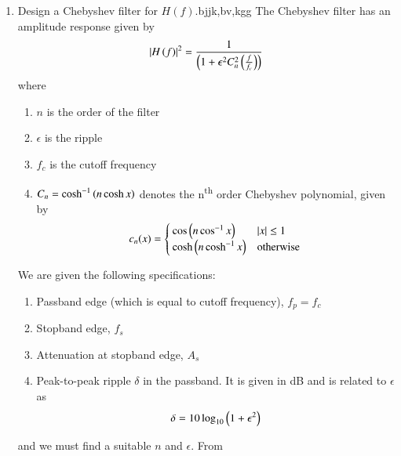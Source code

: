\documentclass[journal,12pt,twocolumn]{IEEEtran}
\renewcommand\thesection{\arabic{section}}
\begin{document}
\begin{enumerate}[label=\thesection.\arabic*
	,ref=\thesection.\theenumi]
	Hence, we take $n = 5$. Solving for $f_c$ in \eqref{eq:fc1} and
	\eqref{eq:fc2},
	\begin{align}
		f_{c1} = f_p\sbrak{10^{-\frac{A_p}{10}} - 1}^{-\frac{1}{2n}} = \SI[parse-numbers=false]{57.23}{\hertz} \\
		f_{c2} = f_s\sbrak{10^{-\frac{A_s}{10}} - 1}^{-\frac{1}{2n}} = \SI[parse-numbers=false]{63.16}{\hertz}
	\end{align}
	Hence, we take $f_c = \sqrt{f_{c1}f_{c2}} = \SI[parse-numbers=false]{60}{\hertz}$ approximately.
	\item Design a Chebyshev filter for $H(f)$.bjjk,bv,kgg
	\solution The Chebyshev filter has an amplitude response
	given by
	\begin{align}
		\left\vert H\left(f\right)\right\vert^2 = \frac{1}{\left(1 + \epsilon^2C_n^2\left(\frac{f}{f_c}\right)\right)}
	\end{align}
	where 
	\begin{enumerate}
		\item $n$ is the order of the filter
		\item $\epsilon$ is the ripple
		\item $f_c$ is the cutoff frequency 
		\item $C_n = \cosh^{-1}\left(n\cosh{x}\right)$ denotes 
		the n\textsuperscript{th} order Chebyshev polynomial,
		given by
		\begin{align}
			c_n(x) =
			\begin{cases}
				\cos\left(n\cos^{-1}x\right) & \left\vert x\right\vert \le 1 \\
				\cosh\left(n\cosh^{-1}x\right) & \textrm{otherwise}
			\end{cases}
			\label{eq:chebypol}
		\end{align}
	\end{enumerate}
	We are given the following specifications:
	\begin{enumerate}
		\item Passband edge (which is equal to 
		cutoff frequency), $f_p = f_c$
		\item Stopband edge, $f_s$
		\item Attenuation at stopband edge, $A_s$
		\item Peak-to-peak ripple $\delta$ in the passband.
		It is given in dB and is related to $\epsilon$ as
		\begin{align}
			\delta = 10\log_{10}\left(1 + \epsilon^2\right)
			\label{eq:delta-eps}
		\end{align}
	\end{enumerate}
	and we must find a suitable $n$ and $\epsilon$. From

\end{enumerate}
\end{document}
